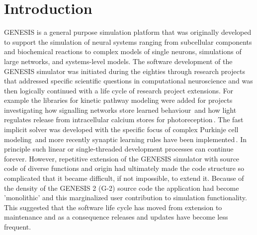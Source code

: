 \documentclass[12pt]{article}
\begin{document}
\section{Introduction}

GENESIS is a general purpose simulation platform that was originally
developed to support the simulation of neural systems ranging from
subcellular components and biochemical reactions to complex models of
single neurons, simulations of large networks, and systems-level
models.
The software development of the GENESIS simulator was initiated during
the eighties through research projects that addressed specific
scientific questions in computational neuroscience and was then
logically continued with a life cycle of research project extensions.
For example the libraries for kinetic pathway modeling were added for
projects investigating how signalling networks store learned
behaviour\,\cite{bhalla99:_emerg} and how light regulates release from
intracellular calcium stores for
photoreception\,\cite{blackwell00:_eviden_distin_light_induc_calcium}.
The fast implicit solver was developed with the specific focus of
complex Purkinje cell modeling\,\cite{deschutter94:_purkin_i,
  deschutter94:_purkin_ii} and more recently synaptic learning rules
have been
implemented\,\cite{guenay08:_chann_densit_distr_explain_spikin}.  In
principle such linear or single-threaded development processes can
continue forever.  However, repetitive extension of the GENESIS
simulator with source code of diverse functions and origin had
ultimately made the code structure so complicated that it became
difficult, if not impossible, to extend it.  Because of the density of
the GENESIS 2 (G-2) source code the application had become
'monolithic' and this marginalized user contribution to simulation
functionality.  This suggested that the software life cycle has moved
from extension to maintenance and as a
consequence releases and updates have become less frequent.

\end{document}
